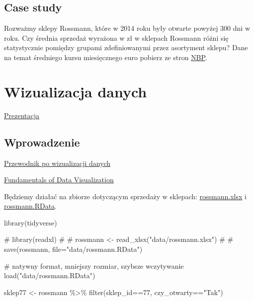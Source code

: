 \documentclass[
  letterpaper,
  DIV=11,
  numbers=noendperiod]{scrreprt}
\newenvironment{Shaded}{\begin{snugshade}}{\end{snugshade}}
\newcommand{\CommentTok}[1]{\textcolor[rgb]{0.37,0.37,0.37}{#1}}
\newcommand{\DecValTok}[1]{\textcolor[rgb]{0.68,0.00,0.00}{#1}}
\newcommand{\FunctionTok}[1]{\textcolor[rgb]{0.28,0.35,0.67}{#1}}
\newcommand{\NormalTok}[1]{\textcolor[rgb]{0.00,0.23,0.31}{#1}}
\newcommand{\OtherTok}[1]{\textcolor[rgb]{0.00,0.23,0.31}{#1}}
\newcommand{\SpecialCharTok}[1]{\textcolor[rgb]{0.37,0.37,0.37}{#1}}
\newcommand{\StringTok}[1]{\textcolor[rgb]{0.13,0.47,0.30}{#1}}
\begin{document}
\hypertarget{case-study}{%
\section{Case study}\label{case-study}}

Rozważmy sklepy Rossmann, które w 2014 roku były otwarte powyżej 300 dni
w roku. Czy średnia sprzedaż wyrażona w zł w sklepach Rossmann różni się
statystycznie pomiędzy grupami zdefiniowanymi przez asortyment sklepu?
Dane na temat średniego kursu miesięcznego euro pobierz ze stron
\href{http://www.nbp.pl/home.aspx?f=/kursy/arch_a.html}{NBP}.


\hypertarget{wizualizacja-danych}{%
\chapter{Wizualizacja danych}\label{wizualizacja-danych}}

\href{presentations/04_wizualizacja.html}{Prezentacja}

\hypertarget{wprowadzenie-2}{%
\section{Wprowadzenie}\label{wprowadzenie-2}}

\href{https://www.data-to-viz.com/}{Przewodnik po wizualizacji danych}

\href{https://serialmentor.com/dataviz/}{Fundamentals of Data
Visualization}

Będziemy działać na zbiorze dotyczącym sprzedaży w sklepach:
\href{http://wawrowski.edu.pl/data/rossmann.xlsx}{rossmann.xlsx} i
\href{http://wawrowski.edu.pl/data/rossmann.RData}{rossmann.RData}.

\begin{Shaded}
\begin{Highlighting}[]
\FunctionTok{library}\NormalTok{(tidyverse)}

\CommentTok{\# library(readxl)}
\CommentTok{\# }
\CommentTok{\# rossmann \textless{}{-} read\_xlsx("data/rossmann.xlsx")}
\CommentTok{\#}
\CommentTok{\# save(rossmann, file="data/rossmann.RData")}

\CommentTok{\# natywny format, mniejszy rozmiar, szybsze wczytywanie}
\FunctionTok{load}\NormalTok{(}\StringTok{"data/rossmann.RData"}\NormalTok{)}

\NormalTok{sklep77 }\OtherTok{\textless{}{-}}\NormalTok{ rossmann }\SpecialCharTok{\%\textgreater{}\%}
  \FunctionTok{filter}\NormalTok{(sklep\_id}\SpecialCharTok{==}\DecValTok{77}\NormalTok{, czy\_otwarty}\SpecialCharTok{==}\StringTok{"Tak"}\NormalTok{)}
\end{Highlighting}
\end{Shaded}
\end{document}
